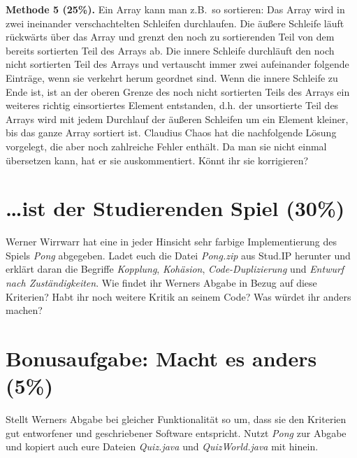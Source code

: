 \documentclass{../pi-aufgabenblatt}
\begin{document}


\textbf{Methode 5 (25\%).} Ein Array kann man z.B.\ so sortieren: Das Array wird in zwei ineinander verschachtelten Schleifen durchlaufen. Die äußere Schleife läuft rückwärts über das Array und grenzt den noch zu sortierenden Teil von dem bereits sortierten Teil des Arrays ab. Die innere Schleife durchläuft den noch nicht sortierten Teil des Arrays und vertauscht immer zwei aufeinander folgende Einträge, wenn sie verkehrt herum geordnet sind. Wenn die innere Schleife zu Ende ist, ist an der oberen Grenze des noch nicht sortierten Teils des Arrays ein weiteres richtig einsortiertes Element entstanden, d.h. der unsortierte Teil des Arrays wird mit jedem Durchlauf der äußeren Schleifen um ein Element kleiner, bis das ganze Array sortiert ist. Claudius Chaos hat die nachfolgende Lösung vorgelegt, die aber noch zahlreiche Fehler enthält. Da man sie nicht einmal übersetzen kann, hat er sie auskommentiert. Könnt ihr sie korrigieren?



\section{\ldots ist der Studierenden Spiel (30\%)}

Werner Wirrwarr hat eine in jeder Hinsicht sehr farbige Implementierung des Spiels \emph{Pong} abgegeben. Ladet euch die Datei \emph{Pong.zip} aus Stud.IP herunter und erklärt daran die Begriffe \emph{Kopplung}, \emph{Kohäsion}, \emph{Code-Duplizierung} und \emph{Entwurf nach Zuständigkeiten}. Wie findet ihr Werners Abgabe in Bezug auf diese Kriterien? Habt ihr noch weitere Kritik an seinem Code? Was würdet ihr anders machen?

\enlargethispage{5mm}
\section{Bonusaufgabe: Macht es anders (5\%)}

Stellt Werners Abgabe bei gleicher Funktionalität so um, dass sie den Kriterien gut entworfener und geschriebener Software entspricht. Nutzt \emph{Pong} zur Abgabe und kopiert auch eure Dateien \emph{Quiz.java} und \emph{QuizWorld.java} mit hinein.
\end{document}
